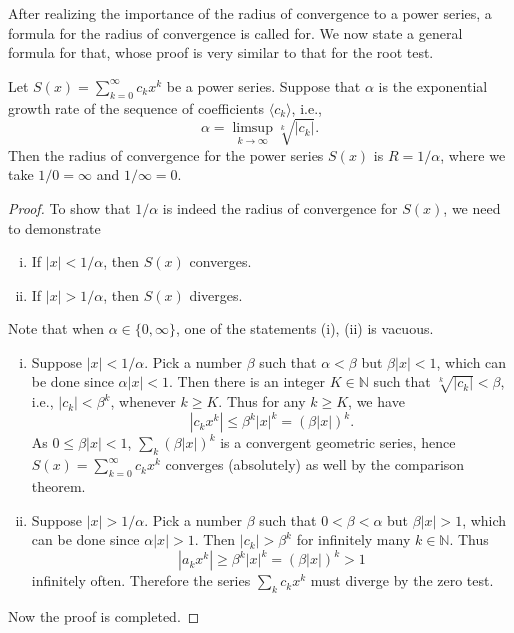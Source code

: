 \documentclass[11pt]{article}
\begin{document}
After realizing the importance of the radius of convergence to a power series, a formula for the radius of convergence is called for.
We now state a general formula for that, whose proof is very similar to that for the root test.

\begin{thm}
  Let $S(x) = \sum_{k=0}^\infty c_k x^k$ be a power series.
  Suppose that $\alpha$ is the exponential growth rate of the sequence of coefficients $\langle c_k \rangle$, i.e.,
  \[
    \alpha = \limsup_{k\to\infty} \sqrt[k]{|c_k|}.
  \]
  Then the radius of convergence for the power series $S(x)$ is $R = 1/\alpha$, where we take $1/0 = \infty$ and $1/\infty = 0$.
\end{thm}

\begin{proof}
  To show that $1/\alpha$ is indeed the radius of convergence for $S(x)$, we need to demonstrate
  \begin{enumerate}[(i)]
    \item If $|x| < 1/\alpha$, then $S(x)$ converges.
    \item If $|x| > 1/\alpha$, then $S(x)$ diverges.
  \end{enumerate}
  Note that when $\alpha \in \{0, \infty\}$, one of the statements (i), (ii) is vacuous.

  \begin{enumerate}[(i)]
    \item Suppose $|x| < 1/\alpha$.
      Pick a number $\beta$ such that $\alpha < \beta$ but $\beta |x| < 1$, which can be done since $\alpha |x| < 1$.
      Then there is an integer $K \in \mathbb{N}$ such that $\sqrt[k]{|c_k|} < \beta$, i.e., $|c_k| < \beta^k$, whenever $k \geqslant K$.
      Thus for any $k \geqslant K$, we have
      \[
	|c_k x^k| \leqslant \beta^k |x|^k = (\beta |x|)^k.
      \]
      As $0 \leqslant \beta|x| < 1$, $\sum_k (\beta |x|)^k$ is a convergent geometric series, hence $S(x) = \sum_{k=0}^\infty c_k x^k$ converges (absolutely) as well by the comparison theorem.

    \item Suppose $|x| > 1/\alpha$.
      Pick a number $\beta$ such that $0 < \beta < \alpha$ but $\beta |x| > 1$, which can be done since $\alpha |x| > 1$.
      Then $|c_k| > \beta^k$ for infinitely many $k \in \mathbb{N}$.
      Thus
      \[
	|a_k x^k| \geqslant \beta^k |x|^k = (\beta|x|)^k > 1
      \]
      infinitely often.
      Therefore the series $\sum_k c_k x^k$ must diverge by the zero test.
  \end{enumerate}

  Now the proof is completed.
\end{proof}
\end{document}
